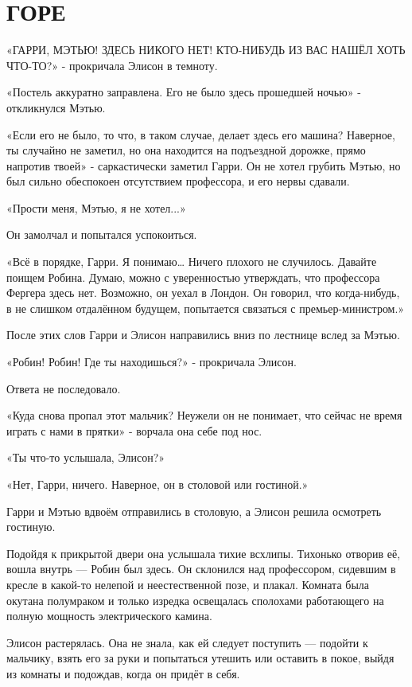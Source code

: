 \documentclass[a4paper,12pt]{book}
\begin{document}
\chapter{ГОРЕ}
\noindent\par«ГАРРИ, МЭТЬЮ! ЗДЕСЬ НИКОГО НЕТ!  КТО-НИБУДЬ ИЗ ВАС НАШЁЛ ХОТЬ ЧТО-ТО?» - прокричала Элисон в темноту.
\par
«Постель аккуратно заправлена. Его не было здесь прошедшей ночью» - откликнулся Мэтью.
\par
«Если его не было, то что, в таком случае, делает здесь его машина? Наверное, ты случайно не заметил, но она находится на подъездной дорожке, прямо напротив твоей» - саркастически заметил Гарри. Он не хотел грубить Мэтью, но был сильно обеспокоен отсутствием профессора, и его нервы сдавали.
\par
«Прости меня, Мэтью, я не хотел...»
\par
Он замолчал и попытался успокоиться.
\par
«Всё в порядке, Гарри. Я понимаю… Ничего плохого не случилось. Давайте поищем Робина. Думаю, можно с уверенностью утверждать, что профессора Фергера здесь нет. Возможно, он уехал в Лондон. Он говорил, что когда-нибудь, в не слишком отдалённом будущем, попытается связаться с премьер-министром.»
\par
После этих слов Гарри и Элисон направились вниз по лестнице вслед за Мэтью.
\par
«Робин! Робин! Где ты находишься?» - прокричала Элисон.
\par
Ответа не последовало.
\par
«Куда снова пропал этот мальчик? Неужели он не понимает, что сейчас не время играть с нами в прятки» - ворчала она себе под нос.
\par
«Ты что-то услышала, Элисон?»
\par
«Нет, Гарри, ничего. Наверное, он в столовой или гостиной.»
\par
Гарри и Мэтью вдвоём отправились в столовую, а Элисон решила осмотреть гостиную.
\par
Подойдя к прикрытой двери она услышала тихие всхлипы. Тихонько отворив её, вошла внутрь — Робин был здесь. Он склонился над профессором, сидевшим в кресле в какой-то нелепой и неестественной позе, и плакал. Комната была окутана полумраком и только изредка освещалась сполохами работающего на полную мощность электрического камина.
\par
Элисон растерялась. Она не знала, как ей следует поступить — подойти к мальчику, взять его за руки и попытаться утешить или оставить в покое, выйдя из комнаты и подождав, когда он придёт в себя.
\end{document}
